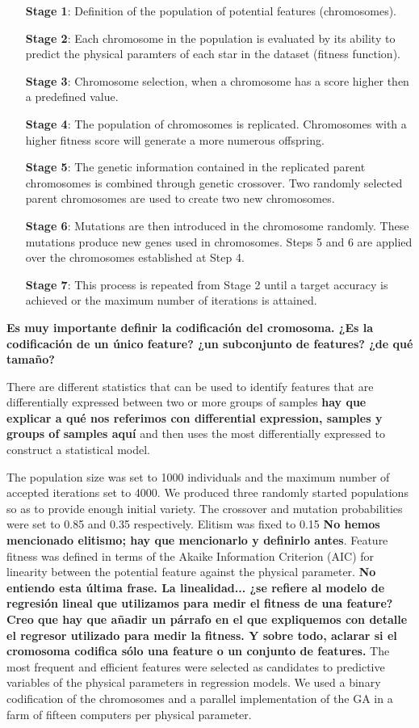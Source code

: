 {{\begin{itemize}
\item [\textbf{Stage 1}:]{Definition of the population of potential features (chromosomes).}
\item [\textbf{Stage 2}:]{Each chromosome in the population is evaluated by its ability to
predict the physical paramters of each star in the dataset (fitness
function).}
\item [\textbf{Stage 3}:]{Chromosome selection, when a chromosome has 
 a score higher then a predefined value.}
\item [\textbf{Stage 4}:]{The population of chromosomes is replicated. 
 Chromosomes with a higher fitness score will generate a more numerous
 offspring.}
\item [\textbf{Stage 5}:]{The genetic information contained in the replicated parent
chromosomes is combined through genetic crossover. Two randomly
selected parent chromosomes are used to create two new chromosomes.}
\item [\textbf{Stage 6}:]{Mutations are then introduced in the chromosome randomly. 
 These mutations produce new genes used in chromosomes.  Steps 5 and 6
 are applied over the chromosomes established at Step 4.}
\item [\textbf{Stage 7}:]{This process is repeated from Stage 2 until 
  a target accuracy is achieved or the maximum number of iterations is
  attained.}
\end{itemize}

{\bf Es muy importante definir la codificación del cromosoma. ¿Es la
codificación de un único feature? ¿un subconjunto de features? ¿de qué
tamaño?}

There are different statistics that can be used to identify features
that are differentially expressed between two or more groups of
samples {\bf hay que explicar a qué nos referimos con differential
expression, samples y groups of samples aquí} and then uses the most
differentially expressed to construct a statistical model.

The population size was set to 1000 individuals and the maximum number
of accepted iterations set to 4000. We produced three randomly started
populations so as to provide enough initial variety. The crossover and
mutation probabilities were set to 0.85 and 0.35 respectively. Elitism
was fixed to 0.15 {\bf No hemos mencionado elitismo; hay que
mencionarlo y definirlo antes}.  Feature fitness was defined in terms
of the Akaike Information Criterion (AIC) for linearity between the
potential feature against the physical parameter. {\bf No entiendo
esta última frase. La linealidad... ¿se refiere al modelo de regresión
lineal que utilizamos para medir el fitness de una feature? Creo que
hay que añadir un párrafo en el que expliquemos con detalle el
regresor utilizado para medir la fitness. Y sobre todo, aclarar si el
cromosoma codifica sólo una feature o un conjunto de features.} The
most frequent and efficient features were selected as candidates to
predictive variables of the physical parameters in regression
models. We used a binary codification of the chromosomes and a
parallel implementation of the GA in a farm of fifteen computers per
physical parameter.

}}

